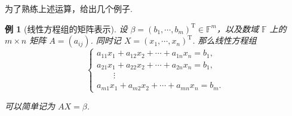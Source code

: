 \documentclass[10pt,openany]{article}
\theoremstyle{thmstyle} %
\theoremstyle{defstyle} %
\theoremstyle{prostyle} %
\theoremstyle{exastyle}
\newtheorem{example}[theorem]{例}
\theoremstyle{remstyle}
\newcommand{\T}{^{\text{T}}}
\newcommand{\F}{\mathbb{F}}
\begin{document}
为了熟练上述运算，给出几个例子.

\begin{example}[线性方程组的矩阵表示]
	设 \( \beta=(b_1,\cdots,b_m)\T \in \F^m \)，以及数域 \( \F \) 上的 \( m \times n \) 矩阵 \( A=(a_{ij}) \). 同时记 \( X=(x_1,\cdots,x_n)\T  \). 那么线性方程组
	\[ \left\{\begin{array}{l}
		a_{11}x_1+a_{12}x_2+\cdots+a_{1n}x_n=b_1, \\
		a_{21}x_1+a_{22}x_2+\cdots+a_{2n}x_n=b_1, \\
		\qquad \vdots \\
		a_{m1}x_1+a_{m2}x_2+\cdots+a_{mn}x_n=b_m.
	\end{array}\right. \]
	
	可以简单记为 \( AX=\beta \).
\end{example}
\end{document}
